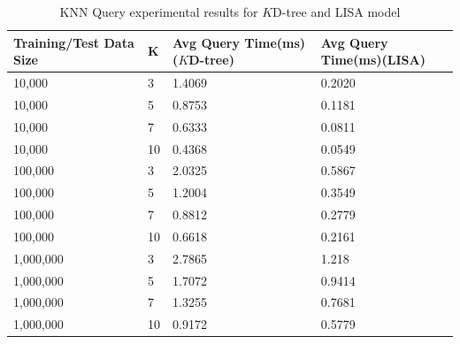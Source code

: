 \begin{table}
	\centering
\centering
	\begin{tabular}{||p{}<{\centering}|p{}<{\centering}|p{}<{\centering}|p{}<{\centering}||}
		\hline
		Training/Test Data Size& K & Avg Query Time(ms)($K$D-tree) & Avg Query Time(ms)(LISA)\\ [0.5ex] 
		\hline
		\hline
	 	10,000& 3& 1.4069 &0.2020 \\
	 	\hline
	 	10,000& 5& 0.8753 &0.1181\\
	 	\hline
	 	10,000& 7& 0.6333 &0.0811 \\
	 	\hline
	 	10,000 & 10& 0.4368 &0.0549 \\
	 	\hline
	 	100,000 & 3& 2.0325 &0.5867 \\
	 	\hline
	 	100,000 & 5& 1.2004 &0.3549 \\
	 	\hline
	 	100,000 & 7& 0.8812 &0.2779 \\
	 	\hline
	 	100,000 & 10&  0.6618 &0.2161 \\
	 	\hline
	    1,000,000 & 3& 2.7865 & 1.218 \\
	 	\hline
	 	1,000,000 & 5& 1.7072 &0.9414 \\
	 	\hline
	 	1,000,000 & 7& 1.3255 &0.7681 \\
	 	\hline
	 	1,000,000 & 10& 0.9172 &0.5779 \\
		\hline
		\hline
	\end{tabular}
	\caption{KNN Query experimental results for $K$D-tree and LISA model}
	\label{KNN_Query_Experimental_Results}

\end{table}
